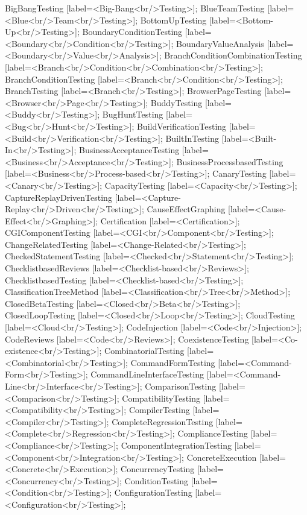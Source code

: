 \documentclass{article}
\begin{document}
{BigBangTesting [label=<Big-Bang<br/>Testing>];
BlueTeamTesting [label=<Blue<br/>Team<br/>Testing>];
BottomUpTesting [label=<Bottom-Up<br/>Testing>];
BoundaryConditionTesting [label=<Boundary<br/>Condition<br/>Testing>];
BoundaryValueAnalysis [label=<Boundary<br/>Value<br/>Analysis>];
BranchConditionCombinationTesting [label=<Branch<br/>Condition<br/>Combination<br/>Testing>];
BranchConditionTesting [label=<Branch<br/>Condition<br/>Testing>];
BranchTesting [label=<Branch<br/>Testing>];
BrowserPageTesting [label=<Browser<br/>Page<br/>Testing>];
BuddyTesting [label=<Buddy<br/>Testing>];
BugHuntTesting [label=<Bug<br/>Hunt<br/>Testing>];
BuildVerificationTesting [label=<Build<br/>Verification<br/>Testing>];
BuiltInTesting [label=<Built-In<br/>Testing>];
BusinessAcceptanceTesting [label=<Business<br/>Acceptance<br/>Testing>];
BusinessProcessbasedTesting [label=<Business<br/>Process-based<br/>Testing>];
CanaryTesting [label=<Canary<br/>Testing>];
CapacityTesting [label=<Capacity<br/>Testing>];
CaptureReplayDrivenTesting [label=<Capture-Replay<br/>Driven<br/>Testing>];
CauseEffectGraphing [label=<Cause-Effect<br/>Graphing>];
Certification [label=<Certification>];
CGIComponentTesting [label=<CGI<br/>Component<br/>Testing>];
ChangeRelatedTesting [label=<Change-Related<br/>Testing>];
CheckedStatementTesting [label=<Checked<br/>Statement<br/>Testing>];
ChecklistbasedReviews [label=<Checklist-based<br/>Reviews>];
ChecklistbasedTesting [label=<Checklist-based<br/>Testing>];
ClassificationTreeMethod [label=<Classification<br/>Tree<br/>Method>];
ClosedBetaTesting [label=<Closed<br/>Beta<br/>Testing>];
ClosedLoopTesting [label=<Closed<br/>Loop<br/>Testing>];
CloudTesting [label=<Cloud<br/>Testing>];
CodeInjection [label=<Code<br/>Injection>];
CodeReviews [label=<Code<br/>Reviews>];
CoexistenceTesting [label=<Co-existence<br/>Testing>];
CombinatorialTesting [label=<Combinatorial<br/>Testing>];
CommandFormTesting [label=<Command-Form<br/>Testing>];
CommandLineInterfaceTesting [label=<Command-Line<br/>Interface<br/>Testing>];
ComparisonTesting [label=<Comparison<br/>Testing>];
CompatibilityTesting [label=<Compatibility<br/>Testing>];
CompilerTesting [label=<Compiler<br/>Testing>];
CompleteRegressionTesting [label=<Complete<br/>Regression<br/>Testing>];
ComplianceTesting [label=<Compliance<br/>Testing>];
ComponentIntegrationTesting [label=<Component<br/>Integration<br/>Testing>];
ConcreteExecution [label=<Concrete<br/>Execution>];
ConcurrencyTesting [label=<Concurrency<br/>Testing>];
ConditionTesting [label=<Condition<br/>Testing>];
ConfigurationTesting [label=<Configuration<br/>Testing>];
}
\end{document}
